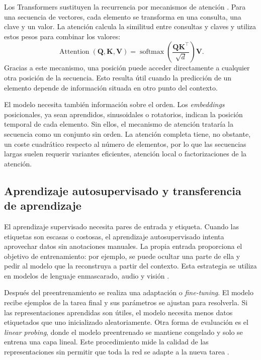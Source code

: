 Los Transformers sustituyen la recurrencia por mecanismos de atención \cite{vaswani2017attention}. Para una secuencia de vectores, cada elemento se transforma en una consulta, una clave y un valor. La atención calcula la similitud entre consultas y claves y utiliza estos pesos para combinar los valores:
\[
    \operatorname{Attention}(\mathbf{Q},\mathbf{K},\mathbf{V}) =
    \operatorname{softmax}\left(
    \frac{\mathbf{Q}\mathbf{K}^{\top}}{\sqrt{d}}
    \right)\mathbf{V}.
\]
Gracias a este mecanismo, una posición puede acceder directamente a cualquier otra posición de la secuencia. Esto resulta útil cuando la predicción de un elemento depende de información situada en otro punto del contexto.

El modelo necesita también información sobre el orden. Los \textit{embeddings} posicionales, ya sean aprendidos, sinusoidales o rotatorios, indican la posición temporal de cada elemento. Sin ellos, el mecanismo de atención trataría la secuencia como un conjunto sin orden. La atención completa tiene, no obstante, un coste cuadrático respecto al número de elementos, por lo que las secuencias largas suelen requerir variantes eficientes, atención local o factorizaciones de la atención.

\subsection{Aprendizaje autosupervisado y transferencia de aprendizaje}

El aprendizaje supervisado necesita pares de entrada y etiqueta. Cuando las etiquetas son escasas o costosas, el aprendizaje autosupervisado intenta aprovechar datos sin anotaciones manuales. La propia entrada proporciona el objetivo de entrenamiento: por ejemplo, se puede ocultar una parte de ella y pedir al modelo que la reconstruya a partir del contexto. Esta estrategia se utiliza en modelos de lenguaje enmascarado, audio y visión \cite{devlin2019bert,baevski2020wav2vec}.

Después del preentrenamiento se realiza una adaptación o \textit{fine-tuning}. El modelo recibe ejemplos de la tarea final y sus parámetros se ajustan para resolverla. Si las representaciones aprendidas son útiles, el modelo necesita menos datos etiquetados que uno inicializado aleatoriamente. Otra forma de evaluación es el \textit{linear probing}, donde el modelo preentrenado se mantiene congelado y solo se entrena una capa lineal. Este procedimiento mide la calidad de las representaciones sin permitir que toda la red se adapte a la nueva tarea \cite{pan2010transfer}.

